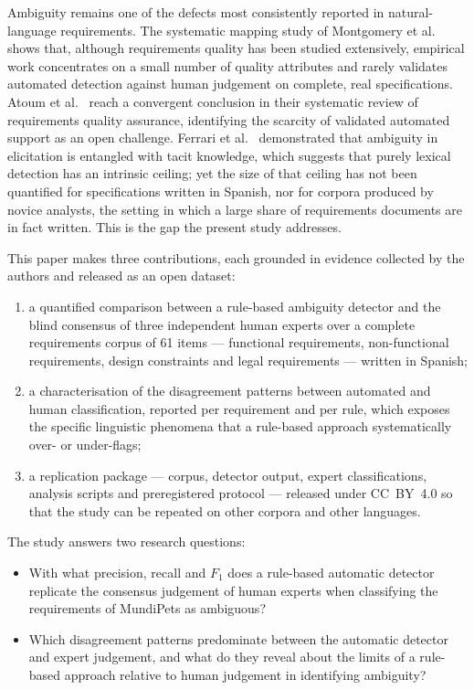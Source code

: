 \documentclass[pdflatex,sn-mathphys-num]{sn-jnl}
\theoremstyle{thmstyleone}%
\theoremstyle{thmstyletwo}%
\theoremstyle{thmstylethree}%
\begin{document}
	Ambiguity remains one of the defects most consistently reported in
	natural-language requirements. The systematic mapping study of Montgomery et
	al.~\cite{montgomery2022} shows that, although requirements quality has been
	studied extensively, empirical work concentrates on a small number of quality
	attributes and rarely validates automated detection against human judgement on
	complete, real specifications. Atoum et al.~\cite{atoum2021} reach a convergent
	conclusion in their systematic review of requirements quality assurance,
	identifying the scarcity of validated automated support as an open challenge.
	Ferrari et al.~\cite{ferrari2016} demonstrated that ambiguity in elicitation is
	entangled with tacit knowledge, which suggests that purely lexical detection has
	an intrinsic ceiling; yet the size of that ceiling has not been quantified for
	specifications written in Spanish, nor for corpora produced by novice analysts,
	the setting in which a large share of requirements documents are in fact
	written. This is the gap the present study addresses.
	
	This paper makes three contributions, each grounded in evidence collected by the
	authors and released as an open dataset:
	\begin{enumerate}
		\item a quantified comparison between a rule-based ambiguity detector and the
		blind consensus of three independent human experts over a complete
		requirements corpus of 61 items --- functional requirements,
		non-functional requirements, design constraints and legal
		requirements --- written in Spanish;
		\item a characterisation of the disagreement patterns between automated and
		human classification, reported per requirement and per rule, which
		exposes the specific linguistic phenomena that a rule-based approach
		systematically over- or under-flags;
		\item a replication package --- corpus, detector output, expert
		classifications, analysis scripts and preregistered protocol ---
		released under CC~BY~4.0 so that the study can be repeated on other
		corpora and other languages.
	\end{enumerate}
	
	The study answers two research questions:
	
	\begin{itemize}
		\item[\textbf{RQ1}] With what precision, recall and $F_1$ does a rule-based
		automatic detector replicate the consensus judgement of human experts
		when classifying the requirements of MundiPets as ambiguous?
		\item[\textbf{RQ2}] Which disagreement patterns predominate between the
		automatic detector and expert judgement, and what do they reveal about
		the limits of a rule-based approach relative to human judgement in
		identifying ambiguity?
	\end{itemize}
	
\end{document}
